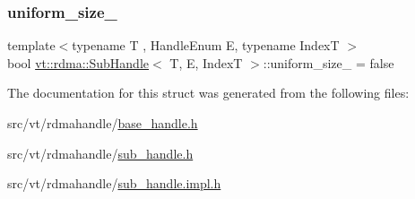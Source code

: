 \mbox{\label{structvt_1_1rdma_1_1_sub_handle_ab6c87db6739367bdbd95be5a8f673fc8}} 
\subsubsection{\texorpdfstring{uniform\+\_\+size\+\_\+}{uniform\_size\_}}
{\footnotesize\ttfamily template$<$typename T , Handle\+Enum E, typename IndexT $>$ \\
bool \hyperlink{structvt_1_1rdma_1_1_sub_handle}{vt\+::rdma\+::\+Sub\+Handle}$<$ T, E, IndexT $>$\+::uniform\+\_\+size\+\_\+ = false\hspace{0.3cm}{\ttfamily [protected]}}



The documentation for this struct was generated from the following files\+:\begin{DoxyCompactItemize}
\item 
src/vt/rdmahandle/\hyperlink{base__handle_8h}{base\+\_\+handle.\+h}\item 
src/vt/rdmahandle/\hyperlink{sub__handle_8h}{sub\+\_\+handle.\+h}\item 
src/vt/rdmahandle/\hyperlink{sub__handle_8impl_8h}{sub\+\_\+handle.\+impl.\+h}\end{DoxyCompactItemize}
